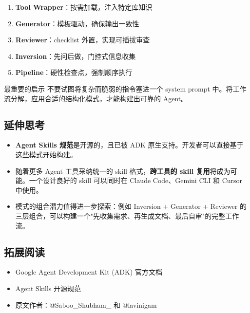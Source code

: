 \documentclass[a4paper]{article}
\begin{document}
\begin{enumerate}
    \item \textbf{Tool Wrapper}：按需加载，注入特定库知识
    \item \textbf{Generator}：模板驱动，确保输出一致性
    \item \textbf{Reviewer}：checklist 外置，实现可插拔审查
    \item \textbf{Inversion}：先问后做，门控式信息收集
    \item \textbf{Pipeline}：硬性检查点，强制顺序执行
\end{enumerate}

\begin{warningbox}{最重要的启示}
不要试图将复杂而脆弱的指令塞进一个 system prompt 中。将工作流分解，应用合适的结构化模式，才能构建出可靠的 Agent。
\end{warningbox}

\subsection{延伸思考}

\begin{itemize}
    \item \textbf{Agent Skills 规范}是开源的，且已被 ADK 原生支持。开发者可以直接基于这些模式开始构建。
    \item 随着更多 Agent 工具采纳统一的 skill 格式，\textbf{跨工具的 skill 复用}将成为可能。一个设计良好的 skill 可以同时在 Claude Code、Gemini CLI 和 Cursor 中使用。
    \item 模式的组合潜力值得进一步探索：例如 Inversion + Generator + Reviewer 的三层组合，可以构建一个"先收集需求、再生成文档、最后自审"的完整工作流。
\end{itemize}

\subsection{拓展阅读}

\begin{itemize}
    \item Google Agent Development Kit (ADK) 官方文档
    \item Agent Skills 开源规范
    \item 原文作者：@Saboo\_Shubham\_ 和 @lavinigam
\end{itemize}

\end{document}
